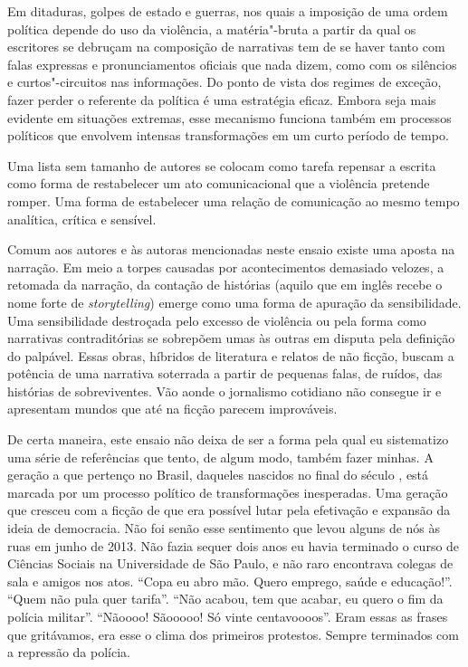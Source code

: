 Em ditaduras, golpes de estado e guerras, nos quais a imposição de uma
ordem política depende do uso da violência, a matéria"-bruta a partir da
qual os escritores se debruçam na composição de narrativas tem de se
haver tanto com falas expressas e pronunciamentos oficiais que nada
dizem, como com os silêncios e curtos"-circuitos nas informações. Do
ponto de vista dos regimes de exceção, fazer perder o referente da
política é uma estratégia eficaz. Embora seja mais evidente em situações
extremas, esse mecanismo funciona também em processos políticos que
envolvem intensas transformações em um curto período de tempo.

Uma lista sem tamanho de autores se colocam como tarefa repensar a
escrita como forma de restabelecer um ato comunicacional que a violência
pretende romper. Uma forma de estabelecer uma relação de comunicação ao
mesmo tempo analítica, crítica e sensível.

Comum aos autores e às autoras mencionadas neste ensaio existe uma aposta na
narração. Em meio a torpes causadas por acontecimentos demasiado
velozes, a retomada da narração, da contação de histórias (aquilo que em
inglês recebe o nome forte de \emph{storytelling}) emerge como uma forma
de apuração da sensibilidade. Uma sensibilidade destroçada pelo excesso %
de violência ou pela forma como narrativas contraditórias se sobrepõem
umas às outras em disputa pela definição do palpável. Essas obras,
híbridos de literatura e relatos de não ficção, buscam a potência de uma
narrativa soterrada a partir de pequenas falas, de ruídos, das histórias
de sobreviventes. Vão aonde o jornalismo cotidiano não consegue ir e
apresentam mundos que até na ficção parecem improváveis.

\asterisc

De certa maneira, este ensaio não deixa de ser a forma pela qual eu
sistematizo uma série de referências que tento, de algum modo, também
fazer minhas. A geração a que pertenço no Brasil, daqueles nascidos no
final do século , está marcada por um processo político de
transformações inesperadas. Uma geração que cresceu com a ficção de que
era possível lutar pela efetivação e expansão da ideia de democracia.
Não foi senão esse sentimento que levou alguns de nós às ruas em junho
de 2013. Não fazia sequer dois anos eu havia terminado o curso de Ciências
Sociais na Universidade de São Paulo, e não raro encontrava colegas de
sala e amigos nos atos. ``Copa eu abro mão. Quero emprego, saúde e
educação!''. ``Quem não pula quer tarifa''. ``Não acabou, tem que
acabar, eu quero o fim da polícia militar''. ``Nãoooo! Sãooooo! Só vinte
centavoooos''. Eram essas as frases que gritávamos, era esse o clima dos
primeiros protestos. Sempre terminados com a repressão da polícia.

